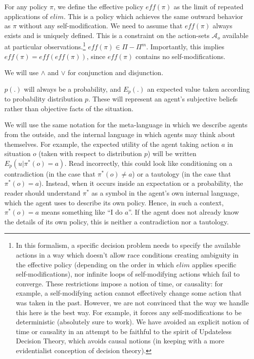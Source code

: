 \documentclass{article}
\begin{document}
For any policy $\pi$, we define the effective policy $\textit{eff}(\pi)$ as the limit of repeated applications of $elim$. This is a policy which achieves the same outward behavior as $\pi$ without any self-modification. We need to assume that $\textit{eff}(\pi)$ always exists and is uniquely defined. This is a constraint on the action-sets $\mathcal{A}_o$ available at particular observations.\footnote{In this formalism, a specific decision problem needs to specify the available actions in a way which doesn't allow race conditions creating ambiguity in the effective policy (depending on the order in which $elim$ applies specific self-modifications), nor infinite loops of self-modifying actions which fail to converge. These restrictions impose a notion of time, or causality: for example, a self-modifying action cannot effectively change some action that was taken in the past. However, we are not convinced that the way we handle this here is the best way. For example, it forces any self-modifications to be deterministic (absolutely sure to work). We have avoided an explicit notion of time or causality in an attempt to be faithful to the spirit of Updateless Decision Theory, which avoids causal notions (in keeping with a more evidentialist conception of decision theory).} $\textit{eff}(\pi) \in \Pi - \Pi^m$. Importantly, this implies $\textit{eff}(\pi) = \textit{eff}(\textit{eff}(\pi))$, since $\textit{eff}(\pi)$ contains no self-modifications.

We will use $\wedge$ and $\vee$ for conjunction and disjunction.

$p(.)$ will always be a probability, and $E_p(.)$ an expected value taken according to probability distribution $p$. These will represent an agent's subjective beliefs rather than objective facts of the situation.

We will use the same notation for the meta-language in which we describe agents from the outside, and the internal language in which agents may think about themselves. For example, the expected utility of the agent taking action $a$ in situation $o$ (taken with respect to distribution $p$) will be written $E_p (u|\pi^*(o)=a)$. Read incorrectly, this could look like conditioning on a contradiction (in the case that $\pi^*(o) \neq a$) or a tautology (in the case that $\pi^*(o)=a$). Instead, when it occurs inside an expectation or a probability, the reader should understand $\pi^*$ as a symbol in the agent's own internal language, which the agent uses to describe its own policy. Hence, in such a context, $\pi^*(o)=a$ means something like ``I do $a$''. If the agent does not already know the details of its own policy, this is neither a contradiction nor a tautology.
\end{document}

